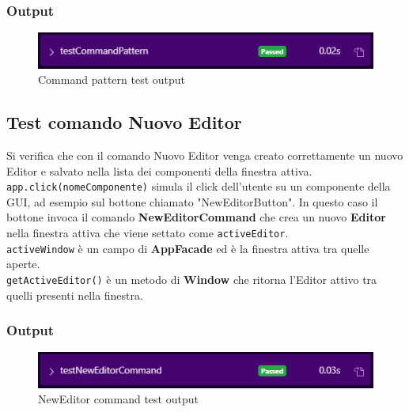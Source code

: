\documentclass[12pt]{article}
\begin{document}
\subsubsection{Output}
\begin{figure}[H]
\centering
\includegraphics[width=\textwidth]{tests/testCommandPattern.png}
\caption{Command pattern test output}
\label{fig:testCommandPatternOutput}
\end{figure}

\subsection{Test comando Nuovo Editor}
Si verifica che con il comando Nuovo Editor venga creato correttamente un nuovo Editor e salvato nella lista dei componenti della finestra attiva.\\
\texttt{app.click(nomeComponente)} simula il click dell'utente su un componente della GUI, ad esempio sul bottone chiamato "NewEditorButton". In questo caso il bottone invoca il comando \textbf{NewEditorCommand} che crea un nuovo \textbf{Editor} nella finestra attiva che viene settato come \texttt{activeEditor}.\\
\texttt{activeWindow} è un campo di \textbf{AppFacade} ed è la finestra attiva tra quelle aperte.\\
\texttt{getActiveEditor()} è un metodo di \textbf{Window} che ritorna l'Editor attivo tra quelli presenti nella finestra.\\
\begin{minipage}{\textwidth}

\end{minipage}
\subsubsection{Output}
\begin{figure}[H]
\centering
\includegraphics[width=\textwidth]{tests/testNewEditorCommand.png}
\caption{NewEditor command test output}
\label{fig:testNewEditorCommandOutput}
\end{figure}
\end{document}
